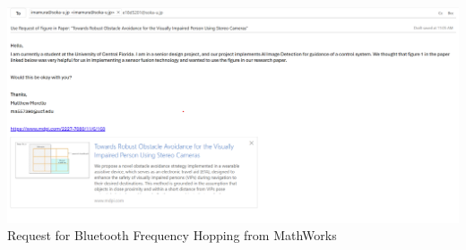 \begin{center}
\includegraphics[width=\textwidth]{./Images/Grid_Image_Perm.png}
\newline Request for Bluetooth Frequency Hopping from MathWorks\\
\end{center}